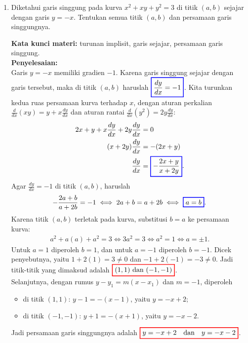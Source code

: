 \documentclass[10pt,openany,a4paper]{article}
\theoremstyle{definition}
\theoremstyle{definition}
\theoremstyle{plain}
\newenvironment{jawab}[2][tes]{%
\par\noindent\textbf{Kata kunci materi:} #1.\\
\textbf{Penyelesaian:} #2%
}{}
\begin{document}
\begin{enumerate}
    \item Diketahui garis singgung pada kurva $x^2+xy+y^2=3$ di titik $(a,b)$ sejajar dengan garis $y=-x$. Tentukan semua titik $(a,b)$ dan persamaan garis singgungnya.
    \begin{jawab}[turunan implisit, garis sejajar, persamaan garis singgung]{~\\
        Garis $y=-x$ memiliki gradien $-1$. Karena garis singgung sejajar dengan garis tersebut, maka di titik $(a,b)$ haruslah $\colorlet{oldcolor}{.}
        \color{blue}
        \setlength{\fboxrule}{1pt} \boxed{\color{oldcolor}\frac{dy}{dx}=-1}\color{oldcolor}$. Kita turunkan kedua ruas persamaan kurva terhadap $x$, dengan aturan perkalian $\frac{d}{dx}(xy)=y+x\frac{dy}{dx}$ dan aturan rantai $\frac{d}{dx}(y^2)=2y\frac{dy}{dx}$:
        \begin{align*}
            2x + y + x\frac{dy}{dx} + 2y\frac{dy}{dx} &= 0\\
            (x + 2y)\frac{dy}{dx} &= -(2x + y)\\
            \frac{dy}{dx} &= \colorlet{oldcolor}{.}
        \color{blue}
        \setlength{\fboxrule}{1pt} \boxed{\color{oldcolor}-\frac{2x+y}{x+2y}}\color{oldcolor}.
        \end{align*}
        Agar $\frac{dy}{dx}=-1$ di titik $(a,b)$, haruslah
        \begin{align*}
            -\frac{2a+b}{a+2b} = -1 \iff 2a+b = a+2b \iff \colorlet{oldcolor}{.}
        \color{blue}
        \setlength{\fboxrule}{1pt} \boxed{\color{oldcolor}a=b}\color{oldcolor}.
        \end{align*}
        Karena titik $(a,b)$ terletak pada kurva, substitusi $b=a$ ke persamaan kurva:
        \begin{align*}
            a^2 + a(a) + a^2 = 3 \iff 3a^2 = 3 \iff a^2=1 \iff a=\pm 1.
        \end{align*}
        Untuk $a=1$ diperoleh $b=1$, dan untuk $a=-1$ diperoleh $b=-1$. Dicek penyebutnya, yaitu $1+2(1)=3\neq 0$ dan $-1+2(-1)=-3\neq 0$. Jadi titik-titik yang dimaksud adalah $\colorlet{oldcolor}{.}
        \color{red}
        \setlength{\fboxrule}{1pt} \boxed{\color{oldcolor}(1,1) \text{ dan } (-1,-1)}\color{oldcolor}$.\\
        Selanjutnya, dengan rumus $y - y_1 = m(x - x_1)$ dan $m=-1$, diperoleh
        \begin{itemize}
            \item di titik $(1,1)$: $y-1=-(x-1)$, yaitu $y=-x+2$;
            \item di titik $(-1,-1)$: $y+1=-(x+1)$, yaitu $y=-x-2$.
        \end{itemize}
        Jadi persamaan garis singgungnya adalah $\colorlet{oldcolor}{.}
        \color{red}
        \setlength{\fboxrule}{1pt} \boxed{\color{oldcolor}y=-x+2 \quad\text{dan}\quad y=-x-2}\color{oldcolor}$.
    }
    \end{jawab}
\end{enumerate}
\end{document}

